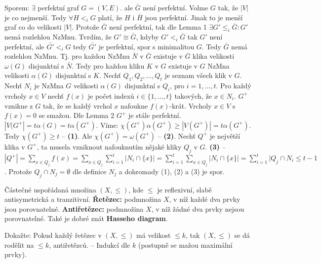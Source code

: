 \begin{dukaz}
	Sporem: $\exists$ perfektní graf $G = (V,E)$. ale $\bar{G}$ není perfektní. Volme $G$ tak, že $|V|$ je co nejmenší. Tedy $\forall H <_{i} G$ platí, že $H$ i $\bar{H}$ jsou perfektní. Jinak to je menší graf co do velikosti $|V|$. Protože $\bar{G}$ není perfektní, tak dle Lemma 1 $\exists G' \leq_{i} \bar{G}: G'$ nemá rozlehlou NzMnu. Tvrdím, že $G' \cong \bar{G}$, kdyby $G' <_{i} \bar{G}$ tak $G'$ není perfektní, ale $\bar{G'} <_{i} G$ tedy $\bar{G'}$ je perfektní, spor s minimalitou $G$. Tedy $\bar{G}$ nemá rozlehlou NzMnu. Tj. pro každou NzMnu $\bar{N}$ v $\bar{G}$ existuje v $\bar{G}$ klika velikosti $\omega(G)$ disjunktní s $\bar{N}$. Tedy pro každou kliku $K$ v $G$ existuje v $G$ NzMna velikosti $\alpha(G)$ disjunktní s $K$. Nechť $Q_{1},Q_{2}, \dots, Q_{t}$ je seznam všech klik v $G$. Nechť $N_{i}$ je NzMna $G$ velikosti $\alpha(G)$ disjunktní s $Q_{i}$, pro $i = 1,\dots, t$. Pro každý vrcholy $x \in V$ nechť $f(x)$ je počet indexů $i \in \{1, \dots, t\}$ takových, že $x \in N_{i}$. $G^{+}$ vznikne z $G$ tak, že se každý vrchol $x$ nafoukne $f(x)$-krát. Vrcholy $x \in V$ s $f(x) = 0$ se smažou. Dle Lemma 2 $G^{+}$ je stále perfektní. $|V(G^{+}| = t \alpha(G) = t \alpha(G^{+})$. Víme: $\chi(G^{+}) \alpha(G^{+}) \geq |V(G^{+})| = t \alpha(G^{+})$. Tedy $\chi(G^{+}) \geq t$ -- \textbf{(1)}. Ale $\chi(G^{+}) = \omega(G^{+})$ -- \textbf{(2)}. Nechť $Q^{+}$ je největší klika v $G^{+}$, ta musela vzniknout nafouknutím nějaké kliky $Q_{j}$ v $G$. \textbf{(3)} -- $|Q^{+}| = \sum_{x \in Q_{j}} f(x) = \sum_{x \in Q_{j}} \sum_{i=1}^{t}|N_{i} \cap \{x\}| = \sum_{i=1}^{t}\sum_{x \in Q_{j}} |N_{i} \cap \{x\}| = \sum_{i=1}^{t} |Q_{j} \cap N_{i} \leq t -1$. Protože $Q_{j} \cap N_{j} = \emptyset$ dle definice $N_{j}$ a dohromady (1), (2) a (3) je spor.
\end{dukaz}

\begin{definice}[Připomenutí]
	Částečné uspořádaná množina $(X, \leq)$, kde $\leq$ je reflexivní, slabě antisymetrická a tranzitivní. \textbf{Řetězec:} podmnožina $X$, v níž každé dva prvky jsou porovnatelné. \textbf{Antiřetězec:} podmnožina $X$, v níž žádné dva prvky nejsou porovnatelné. Také je dobré znát \textbf{Hasseho diagram}.
\end{definice}

\begin{cvic}
	Dokažte: Pokud každý řetězec v $(X, \leq)$ má velikost $\leq k$, tak $(X,\leq)$ se dá rodělit na $\leq k$, antiřetězců. -- Indukcí dle $k$ (postupně se mažou maximální prvky).

\end{cvic}


